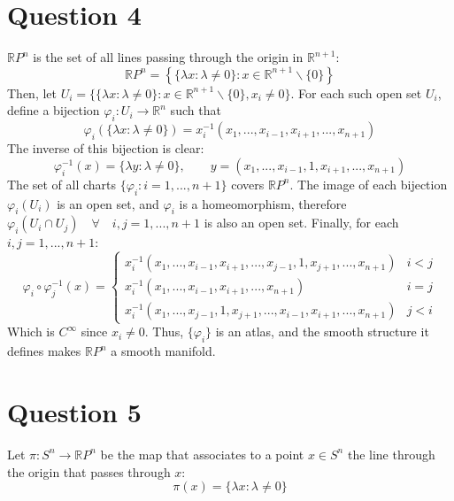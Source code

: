 \documentclass{article}
\newcommand{\R}{\ensuremath{\mathbb{R}}}
\begin{document}
\section*{Question 4}
$\R P^n$ is the set of all lines passing through the origin in $\R^{n+1}$:
\begin{equation}
    \R P^n = \left\{
        \{\lambda x: \lambda \ne 0\}
        : x \in \R^{n+1} \backslash \{0\}
    \right\}
\end{equation}
Then, let $U_i = \{\{\lambda x: \lambda \ne 0\}: x \in \R^{n+1} \backslash \{0\}, x_i \ne 0 \}$. For each such open set $U_i$, define a bijection $\varphi_i : U_i \rightarrow \R^{n}$ such that
\begin{equation}
    \varphi_i (\{\lambda x: \lambda \ne 0\}) = x_i^{-1} (x_1, ..., x_{i-1}, x_{i+1}, ..., x_{n+1})
\end{equation}
The inverse of this bijection is clear:
\begin{equation}
    \varphi_i^{-1} (x) = \{\lambda y : \lambda \ne 0\}, \qquad y = (x_1, ..., x_{i-1}, 1, x_{i+1}, ..., x_{n+1})
\end{equation}
The set of all charts $\{\varphi_i: i = 1,..., n+1 \}$ covers $\R P^n$. The image of each bijection $\varphi_i (U_i)$ is an open set, and $\varphi_i$ is a homeomorphism, therefore $\varphi_i(U_i \cap U_j) \quad \forall \quad i,j = 1,...,n+1$ is also an open set. Finally, for each $i, j = 1,...,n+1$:
\begin{equation}
    \varphi_i \circ \varphi_j^{-1} (x) = \begin{cases}
        x_i^{-1} (x_1, ..., x_{i-1}, x_{i+1}, ..., x_{j-1}, 1, x_{j+1},...,x_{n+1}) 
        & i < j
        \\
        x_i^{-1} (x_1, ..., x_{i-1}, x_{i+1},...,x_{n+1}) 
        & i = j
        \\
        x_i^{-1} (x_1, ..., x_{j-1}, 1, x_{j+1},..., x_{i-1}, x_{i+1}, ...,x_{n+1}) 
        & j < i
    \end{cases}
\end{equation}
Which is $C^\infty$ since $x_i \ne 0$. Thus, $\{\varphi_i\}$ is an atlas, and the smooth structure it defines makes $\R P^n$ a smooth manifold.

\section*{Question 5}
Let $\pi : S^n \rightarrow \R P^n$ be the map that associates to a point $x \in S^n$ the line through the origin that passes through $x$:
\begin{equation}
    \pi(x) = \{\lambda x: \lambda \ne 0\}
\end{equation} 
\end{document}
